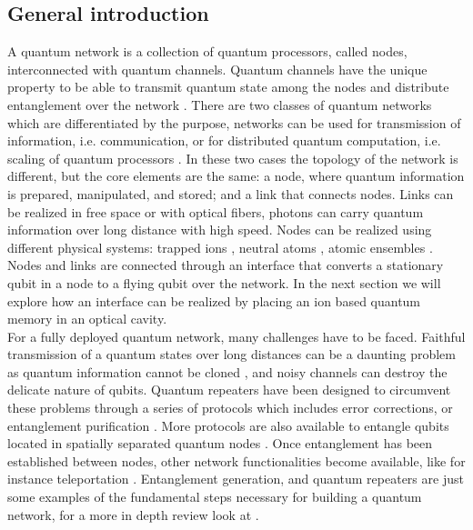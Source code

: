\subsection{General introduction}
A quantum network is a collection of quantum processors, called nodes, interconnected with quantum channels. Quantum channels have the unique property to be able to transmit quantum state among the nodes and distribute entanglement over the network \cite{kimble}. There are two classes of quantum networks which are differentiated by the purpose, networks can be used for transmission of information, i.e. communication, or for distributed quantum computation, i.e. scaling of quantum processors \cite{ion_quantumnetwork}.
In these two cases the topology of the network is different, but the core elements are the same: a node, where quantum information is prepared, manipulated, and stored; and a link that connects nodes. Links can be realized in free space \cite{Hughes2002} or with optical fibers, photons can carry quantum information over long distance with high speed. Nodes can be realized using different physical systems: trapped ions \cite{ion_quantumnetwork}, neutral atoms \cite{Ritter2012}, atomic ensembles \cite{kimble}. Nodes and links are connected through an interface that converts a stationary qubit in a node to a flying qubit over the network.  In the next section we will explore how an interface can be realized by placing an ion based quantum memory in an optical cavity.\\
For a fully deployed quantum network, many challenges have to be faced. Faithful transmission of a quantum states over long distances can be a daunting problem as quantum information cannot be cloned \cite{nocloning}, and noisy channels can destroy the delicate nature of qubits. Quantum repeaters have been designed \cite{quantumrepeters} to circumvent these problems through a series of protocols which includes error corrections, or entanglement purification \cite{Pan2001}. More protocols are also available to  entangle qubits located in spatially separated quantum nodes \cite{Duan2001}. Once entanglement has been established between nodes, other network functionalities become available, like for instance teleportation \cite{PhysRevLett.70.1895}. Entanglement generation, and quantum repeaters are just some examples of the fundamental steps necessary for building a quantum network, for a more in depth review look at \cite{Wehnereaam9288}.


